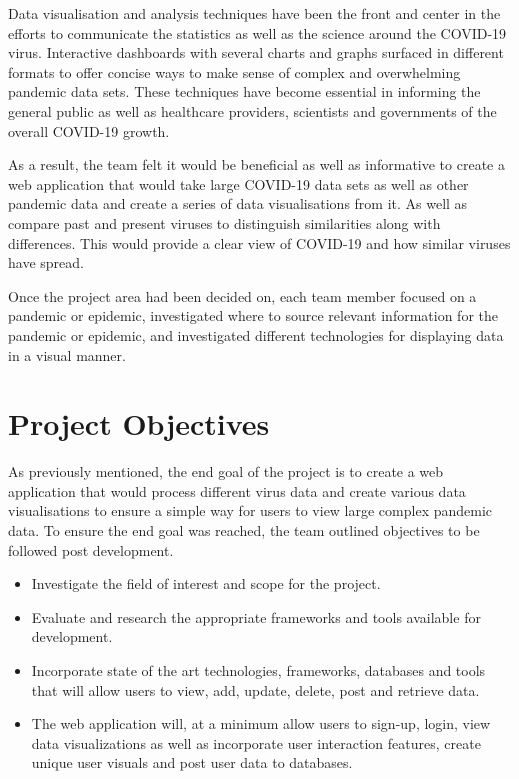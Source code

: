 \vspace{5mm} %

Data visualisation and analysis techniques have been the front and center in the efforts to communicate the statistics as well as the science around the COVID-19 virus. Interactive dashboards with several charts and graphs surfaced in different formats to offer concise ways to make sense of complex and overwhelming pandemic data sets. These techniques have become essential in informing the general public as well as healthcare providers, scientists and governments of the overall COVID-19 growth.

\vspace{5mm} %

As a result, the team felt it would be beneficial as well as informative to create a web application that would take large COVID-19 data sets as well as other pandemic data and create a series of data visualisations from it. As well as compare past and present viruses to distinguish similarities along with differences. This would provide a clear view of COVID-19 and how similar viruses have spread.

\vspace{5mm} %

Once the project area had been decided on, each team member focused on a pandemic or epidemic, investigated where to source relevant information for the pandemic or epidemic, and investigated different technologies for displaying data in a visual manner.

\section{Project Objectives}
As previously mentioned, the end goal of the project is to create a web application that would process different virus data and create various data visualisations to ensure a simple way for users to view large complex pandemic data. To ensure the end goal was reached, the team outlined objectives to be followed post development.

\begin{itemize}
  \item Investigate the field of interest and scope for the project.
  \item Evaluate and research the appropriate frameworks and tools available for development.
  \item Incorporate state of the art technologies, frameworks, databases and tools that will allow users to view, add, update, delete, post and retrieve data.
  \item The web application will, at a minimum allow users to sign-up, login, view data visualizations as well as incorporate user interaction features, create unique user visuals and post user data to databases.
\end{itemize}

